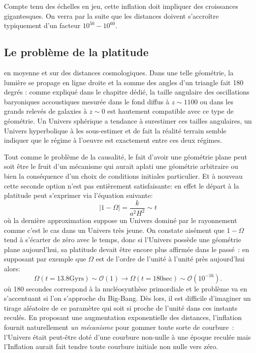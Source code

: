 Compte tenu des échelles en jeu, cette inflation doit impliquer des croissances gigantesques. On verra par la suite que les distances doivent s'accroître typiquement d'un facteur $10^{50}-10^{60}$.


\subsection{Le problème de la platitude}
 en moyenne et sur des distances cosmologiques. Dans une telle géométrie, la lumière se propage en ligne droite et la somme des angles d'un triangle fait 180 degrés : comme expliqué dans le chapitre dédié, la taille angulaire des oscillations baryoniques accoustiques mesurée dans le fond diffus à $z\sim1100$ ou dans les grands relevés de galaxies à $z\sim 0$ est hautement compatible avec ce type de géométrie. Un Univers sphérique a tendance à surestimer ces tailles angulaires, un Univers hyperbolique à les sous-estimer et de fait la réalité terrain semble indiquer que le régime à l'oeuvre est exactement entre ces deux régimes.

Tout comme le problème de la causalité, le fait d'avoir une géométrie plane peut soit être le fruit d'un mécanisme qui aurait aplati une géométrie arbitraire ou bien la conséquence d'un choix de conditions initiales particulier. Et à nouveau cette seconde option n'est pas entièrement satisfaisante: en effet le départ à la platitude peut s'exprimer via l'équation suivante:
\begin{equation}
|1-\Omega|=\frac{k}{a^2 H^2}\sim t
\end{equation}
où la dernière approximation suppose un Univers dominé par le rayonnement comme c'est le cas dans un Univers très jeune. On constate aisément que $1-\Omega$ tend à s'écarter de zéro avec le temps, donc si l'Univers possède une géométrie plane aujourd'hui, sa platitude devait être encore plus affirmée dans le passé~: en supposant par exemple que $\Omega$ est de l'ordre de l'unité à l'unité près aujourd'hui alors:
\begin{equation}
\Omega (t=13.8 \mathrm{Gyrs}) \sim \mathcal{O} (1) \rightarrow \Omega (t=180 \mathrm{sec}) \sim \mathcal{O} (10^{-16}).
\end{equation}
où 180 secondes correspond à la nucléosynthèse primordiale et le problème va en s'accentuant si l'on s'approche du Big-Bang.
Dès lors, il est difficile d'imaginer un tirage aléatoire de ce paramètre qui soit si proche de l'unité dans ces instants reculés. En proposant une augmentation exponentielle des distances, l'inflation fournit naturellement \textit{un mécanisme} pour gommer toute sorte de courbure~: l'Univers était peut-être doté d'une courbure non-nulle à une époque reculée mais l'Inflation aurait fait tendre toute courbure initiale non nulle vers zéro.

